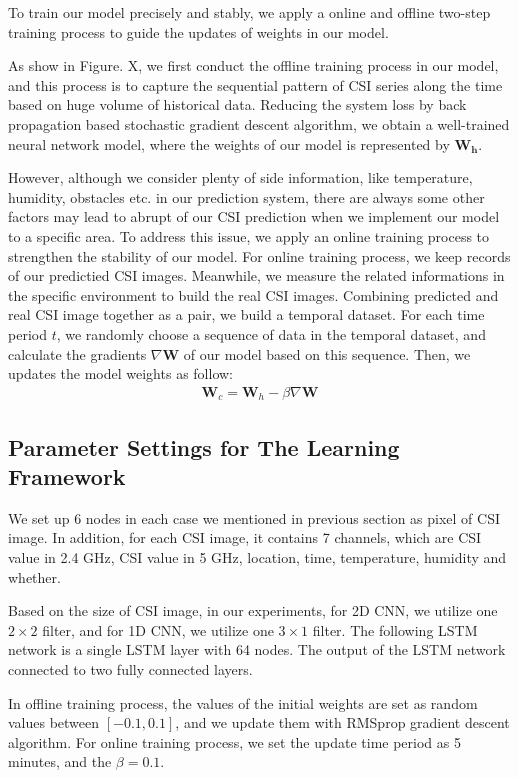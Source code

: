 \documentclass[10pt,conference,letterpaper]{IEEEtran}
\begin{document}
To train our model precisely and stably, we apply a online and offline two-step training process to guide the updates of weights in our model. 

As show in Figure. X, we first conduct the offline training process in our model, and this process is to capture the sequential pattern of CSI series along the time based on huge volume of historical data. Reducing the system loss by back propagation based stochastic gradient descent algorithm, we obtain a well-trained neural network model, where the weights of our model is represented by $\mathbf{W_h}$.

However, although we consider plenty of side information, like temperature, humidity, obstacles etc. in our prediction system, there are always some other factors may lead to abrupt of our CSI prediction when we implement our model to a specific area. To address this issue, we apply an online training process to strengthen the stability of our model. For online training process, we keep records of our predictied CSI images. Meanwhile, we measure the related informations in the specific environment to build the real CSI images. Combining predicted and real CSI image together as a pair, we build a temporal dataset. For each time period $t$, we randomly choose a sequence of data in the temporal dataset, and calculate the gradients $\nabla {\mathbf{W}}$ of our model based on this sequence. Then, we updates the model weights as follow:
\begin{eqnarray}
\mathbf{W}_c  = \mathbf{W}_h  - \beta \nabla {\mathbf{W}} 
\end{eqnarray}
\subsection{Parameter Settings for The Learning Framework}
\label{subsubsec:case1-rnncnn}

We set up 6 nodes in each case we mentioned in previous section as pixel of CSI image. In addition, for each CSI image, it contains 7 channels, which are CSI value in 2.4 GHz, CSI value in 5 GHz, location, time, temperature, humidity and whether. 

Based on the size of CSI image, in our experiments, for 2D CNN, we utilize one $2\times2$ filter, and for 1D CNN, we utilize one $3\times1$ filter. The following LSTM network is a single LSTM layer with 64 nodes. The output of the LSTM network connected to two fully connected layers.

In offline training process, the values of the initial weights are set as random values between $[-0.1, 0.1]$, and we update them with RMSprop gradient descent algorithm. For online training process, we set the update time period as 5 minutes, and the $\beta = 0.1$.
\end{document}
